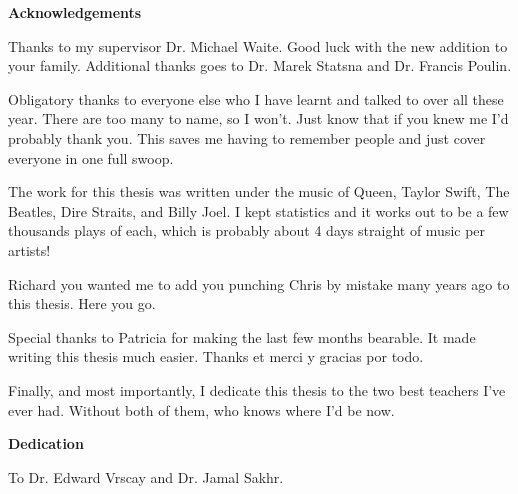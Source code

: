 
\begin{center}\textbf{Acknowledgements}\end{center}
Thanks to my supervisor Dr. Michael Waite. Good luck with the new addition to your family. Additional thanks goes to Dr. Marek Statsna and Dr. Francis Poulin. 

Obligatory thanks to everyone else who I have learnt and talked to over all these year. There are too many to name, so I won't. Just know that if you knew me I'd probably thank you. This saves me having to remember people and just cover everyone in one full swoop.

The work for this thesis was written under the music of Queen, Taylor Swift, The Beatles, Dire Straits, and Billy Joel. I kept statistics and it works out to be a few thousands plays of each, which is probably about 4 days straight of music per artists!

Richard you wanted me to add you punching Chris by mistake many years ago to this thesis. Here you go.

Special thanks to Patricia for making the last few months bearable. It made writing this thesis much easier. Thanks et merci y gracias por todo. 

Finally, and most importantly, I dedicate this thesis to the two best teachers I've ever had. Without both of them, who knows where I'd be now. 
\cleardoublepage


\begin{center}\textbf{Dedication}\end{center}
\begin{center}To Dr. Edward Vrscay and Dr. Jamal Sakhr.\end{center}
\cleardoublepage


\renewcommand\contentsname{Table of Contents}
\tableofcontents
\cleardoublepage
{}

\listoftables
\cleardoublepage
{}		%

\listoffigures
\cleardoublepage
{}		%



